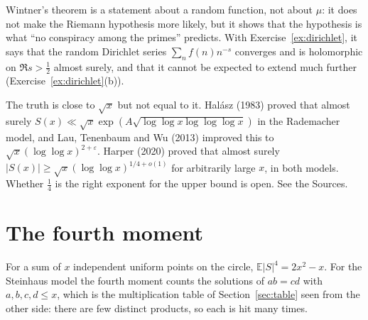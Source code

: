 Wintner's theorem is a statement about a random function, not about $\mu$: it does not make the Riemann hypothesis more likely, but it shows that the hypothesis is what ``no conspiracy among the primes'' predicts. With Exercise~\ref{ex:dirichlet}, it says that the random Dirichlet series $\sum_nf(n)n^{-s}$ converges and is holomorphic on $\Re s>\frac12$ almost surely, and that it cannot be expected to extend much further (Exercise~\ref{ex:dirichlet}(b)).

\begin{remark}
The truth is close to $\sqrt x$ but not equal to it. Halász (1983) proved that almost surely $S(x)\ll\sqrt x\exp(A\sqrt{\log\log x\log\log\log x})$ in the Rademacher model, and Lau, Tenenbaum and Wu (2013) improved this to $\sqrt x(\log\log x)^{2+\varepsilon}$. Harper (2020) proved that almost surely $|S(x)|\ge\sqrt x(\log\log x)^{1/4+o(1)}$ for arbitrarily large $x$, in both models. Whether $\frac14$ is the right exponent for the upper bound is open. See the Sources.
\end{remark}

\section{The fourth moment}\label{sec:fourth}

For a sum of $x$ independent uniform points on the circle, $\mathbb E|S|^4=2x^2-x$. For the Steinhaus model the fourth moment counts the solutions of $ab=cd$ with $a,b,c,d\le x$, which is the multiplication table of Section~\ref{sec:table} seen from the other side: there are few distinct products, so each is hit many times.

